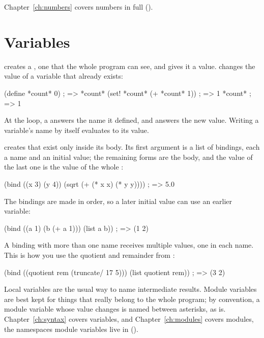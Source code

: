 Chapter~\ref{ch:numbers} covers numbers in full ().

\section{Variables}\label{sec:tut-variables}

 creates a , one that the whole
program can see, and gives it a value.  changes the value of a
variable that already exists:

\begin{dylan}
(define *count* 0)            ; => *count*
(set! *count* (+ *count* 1))  ; => 1
*count*                       ; => 1
\end{dylan}

At the loop, a  answers the name it defined, and
 answers the new value. Writing a variable's name by itself
evaluates to its value.

 creates  that exist only inside its
body. Its first argument is a list of bindings, each a name and an
initial value; the remaining forms are the body, and the value of the
last one is the value of the whole :

\begin{dylan}
(bind ((x 3)
       (y 4))
  (sqrt (+ (* x x) (* y y))))   ; => 5.0
\end{dylan}

The bindings are made in order, so a later initial value can use an
earlier variable:

\begin{dylan}
(bind ((a 1)
       (b (+ a 1)))
  (list a b))                   ; => (1 2)
\end{dylan}

A binding with more than one name receives multiple values, one in each
name. This is how you use the quotient and remainder from
:

\begin{dylan}
(bind ((quotient rem (truncate/ 17 5)))
  (list quotient rem))          ; => (3 2)
\end{dylan}

Local variables are the usual way to name intermediate results. Module
variables are best kept for things that really belong to the whole
program; by convention, a module variable whose value changes is named
between asterisks, as  is. Chapter~\ref{ch:syntax} covers
variables, and Chapter~\ref{ch:modules} covers modules, the namespaces
module variables live in ().

